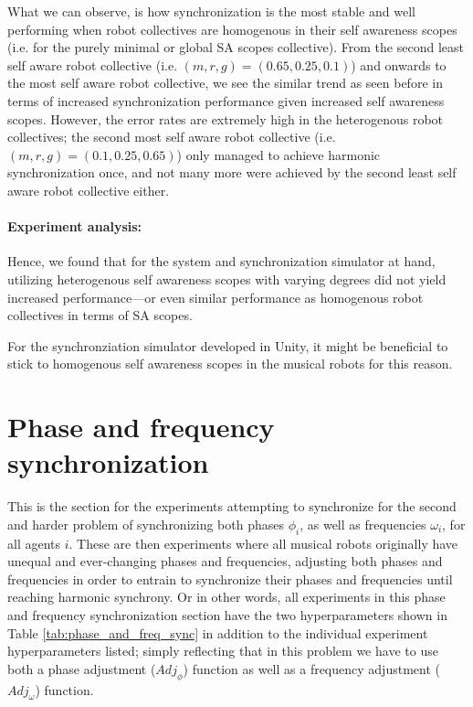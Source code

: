 			What we can observe, is how synchronization is the most stable and well performing when robot collectives are homogenous in their self awareness scopes (i.e. for the purely minimal or global SA scopes collective). From the second least self aware robot collective (i.e. $(m,r,g)=(0.65,0.25,0.1)$) and onwards to the most self aware robot collective, we see the similar trend as seen before in terms of increased synchronization performance given increased self awareness scopes. However, the error rates are extremely high in the heterogenous robot collectives; the second most self aware robot collective (i.e. $(m,r,g)=(0.1,0.25,0.65)$) only managed to achieve harmonic synchronization once, and not many more were achieved by the second least self aware robot collective either.
			
			\paragraph{Experiment analysis:\nl}
			
			Hence, we found that for the system and synchronization simulator at hand, utilizing heterogenous self awareness scopes with varying degrees did not yield increased performance—or even similar performance as homogenous robot collectives in terms of SA scopes.
			
			For the synchronziation simulator developed in Unity, it might be beneficial to stick to homogenous self awareness scopes in the musical robots for this reason.

\np	




\section{Phase and frequency synchronization}
\label{sec:phase_and_freq_sync_experiments}
This is the section for the experiments attempting to synchronize for the second and harder problem of synchronizing both phases $\phi_i$, as well as frequencies $\omega_i$, for all agents $i$. These are then experiments where all musical robots originally have unequal and ever-changing phases and frequencies, adjusting both phases and frequencies in order to entrain to synchronize their phases and frequencies until reaching harmonic synchrony. Or in other words, all experiments in this phase and frequency synchronization section have the two hyperparameters shown in Table \ref{tab:phase_and_freq_sync} in addition to the individual experiment hyperparameters listed; simply reflecting that in this problem we have to use both a phase adjustment ($Adj_{\phi}$) function as well as a frequency adjustment ($Adj_{\omega}$) function.

